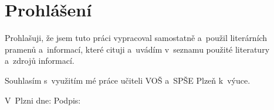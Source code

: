 \section*{Prohlášení}
\noindent
Prohlašuji, že jsem tuto práci vypracoval samostatně a~použil literárních
pramenů a~informací, které cituji a~uvádím v~seznamu použité literatury
a~zdrojů informací.

\noindent
Souhlasím s~využitím mé práce učiteli VOŠ a~SPŠE Plzeň k~výuce.

{%
    \raggedright
    \hfill V~Plzni dne: \dotfill \hspace*{1em}Podpis: \dotfill
}
